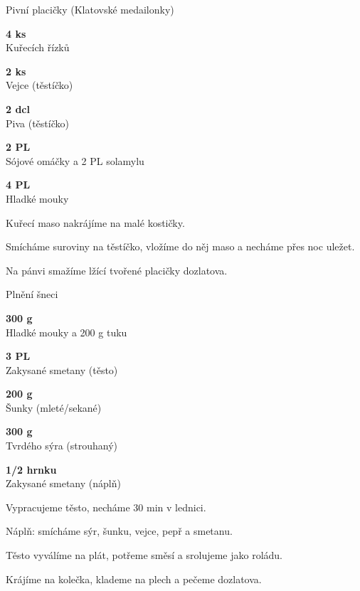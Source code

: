 \documentclass[11pt,a4paper]{article}
\begin{document}
\begin{recipe}[MidnightBlue]{Pivní placičky (Klatovské medailonky)}
    \begin{ingredients}
        \item \parbox[t]{\linewidth}{\raggedright \piece \textbf{4 ks}\\ Kuřecích řízků}
        \item \parbox[t]{\linewidth}{\raggedright \piece \textbf{2 ks}\\ Vejce (těstíčko)}
        \item \parbox[t]{\linewidth}{\raggedright \liquid \textbf{2 dcl}\\ Piva (těstíčko)}
        \item \parbox[t]{\linewidth}{\raggedright \spoon \textbf{2 PL}\\ Sójové omáčky a 2 PL solamylu}
        \item \parbox[t]{\linewidth}{\raggedright \spoon \textbf{4 PL}\\ Hladké mouky}
    \end{ingredients}
    \begin{steps}
        \item Kuřecí maso nakrájíme na malé kostičky.
        \item Smícháme suroviny na těstíčko, vložíme do něj maso a necháme přes noc uležet.
        \item Na pánvi smažíme lžící tvořené placičky dozlatova.
    \end{steps}
\end{recipe}

\begin{recipe}[Goldenrod]{Plnění šneci}
    \begin{ingredients}
        \item \parbox[t]{\linewidth}{\raggedright \weight \textbf{300 g}\\ Hladké mouky a 200 g tuku}
        \item \parbox[t]{\linewidth}{\raggedright \spoon \textbf{3 PL}\\ Zakysané smetany (těsto)}
        \item \parbox[t]{\linewidth}{\raggedright \weight \textbf{200 g}\\ Šunky (mleté/sekané)}
        \item \parbox[t]{\linewidth}{\raggedright \weight \textbf{300 g}\\ Tvrdého sýra (strouhaný)}
        \item \parbox[t]{\linewidth}{\raggedright \liquid \textbf{1/2 hrnku}\\ Zakysané smetany (náplň)}
    \end{ingredients}
    \begin{steps}
        \item Vypracujeme těsto, necháme 30 min v lednici.
        \item Náplň: smícháme sýr, šunku, vejce, pepř a smetanu.
        \item Těsto vyválíme na plát, potřeme směsí a srolujeme jako roládu.
        \item Krájíme na kolečka, klademe na plech a pečeme dozlatova.
    \end{steps}
\end{recipe}
\end{document}
